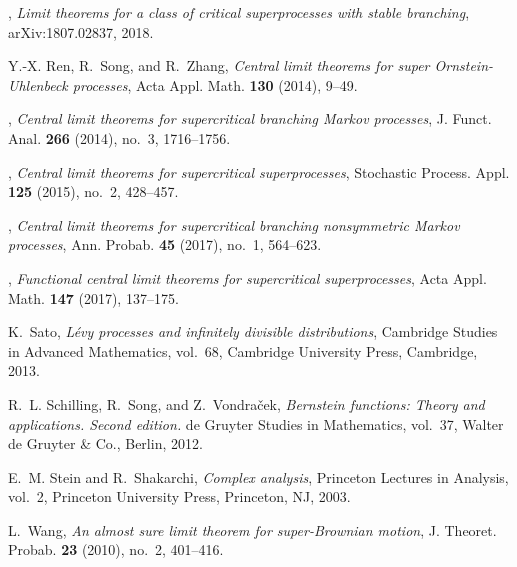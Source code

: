 \documentclass[12pt,a4paper]{amsart}
\theoremstyle{plain}
\theoremstyle{definition}
\numberwithin{equation}{section}
\begin{document}
\begin{thebibliography}{10}
\bysame, \emph{Limit theorems for a class of critical superprocesses with stable branching},
    arXiv:1807.02837, 2018.

Y.-X. Ren, R.~Song, and R.~Zhang, \emph{Central limit theorems for super
  {O}rnstein-{U}hlenbeck processes}, Acta Appl. Math. \textbf{130} (2014),
  9--49.

\bysame, \emph{Central limit theorems for supercritical branching {M}arkov
  processes}, J. Funct. Anal. \textbf{266} (2014), no.~3, 1716--1756.

\bysame, \emph{Central limit theorems for supercritical superprocesses},
  Stochastic Process. Appl. \textbf{125} (2015), no.~2, 428--457.

\bysame, \emph{Central limit theorems for supercritical branching nonsymmetric
  {M}arkov processes}, Ann. Probab. \textbf{45} (2017), no.~1, 564--623.

\bysame, \emph{Functional central limit theorems for supercritical
  superprocesses}, Acta Appl. Math. \textbf{147} (2017), 137--175.

K.~Sato, \emph{L{\'e}vy processes and infinitely divisible distributions},
  Cambridge Studies in Advanced Mathematics, vol.~68, Cambridge University
  Press, Cambridge, 2013.

R.~L. Schilling, R.~Song, and Z.~Vondra\v{c}ek,
\emph{Bernstein functions: Theory and applications. Second edition.}
de  Gruyter Studies in Mathematics, vol.~37, Walter de Gruyter \& Co., Berlin,
  2012.

E.~M. Stein and R.~Shakarchi, \emph{Complex analysis}, Princeton Lectures in
  Analysis, vol.~2, Princeton University Press, Princeton, NJ, 2003.

L.~Wang, \emph{An almost sure limit theorem for super-{B}rownian motion}, J.
  Theoret. Probab. \textbf{23} (2010), no.~2, 401--416.


\end{thebibliography}
\end{document}
